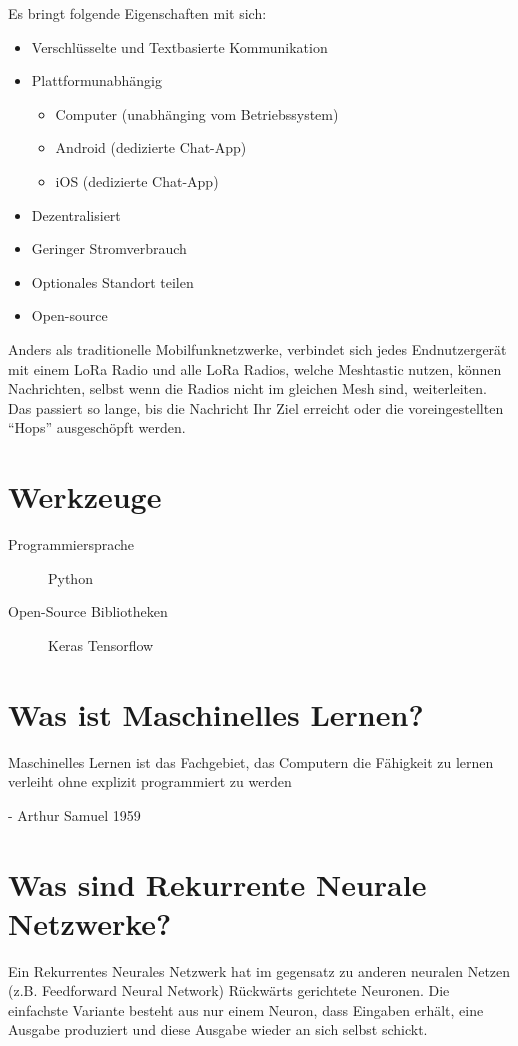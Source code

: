 \documentclass[12pt,a4paper]{article}
\begin{document}
Es bringt folgende Eigenschaften mit sich:
\begin{itemize}
	\item Verschlüsselte und Textbasierte Kommunikation
	\item Plattformunabhängig
	\begin{itemize}
		\item Computer (unabhänging vom Betriebssystem)
		\item Android (dedizierte Chat-App)
		\item iOS (dedizierte Chat-App)
	\end{itemize}
	\item Dezentralisiert
	\item Geringer Stromverbrauch
	\item Optionales Standort teilen
	\item Open-source
\end{itemize}

Anders als traditionelle Mobilfunknetzwerke, verbindet sich jedes Endnutzergerät mit einem LoRa Radio und alle LoRa Radios, welche Meshtastic nutzen, können Nachrichten, selbst wenn die Radios nicht im gleichen Mesh sind, weiterleiten. Das passiert so lange, bis die Nachricht Ihr Ziel erreicht oder die voreingestellten “Hops” ausgeschöpft werden.


\section{Werkzeuge}
\begin{description}


    \item [Programmiersprache]\tab Python
    \item [Open-Source Bibliotheken]\tab Keras \newline \tab \tab Tensorflow
 
 
\end{description}

\section{Was ist Maschinelles Lernen?}
Maschinelles Lernen ist das Fachgebiet, das Computern die Fähigkeit zu lernen verleiht ohne explizit programmiert zu werden
\begin{flushright} - Arthur Samuel 1959  \end{flushright}

\section{Was sind Rekurrente Neurale Netzwerke?}
Ein Rekurrentes Neurales Netzwerk hat im gegensatz zu anderen neuralen Netzen (z.B. Feedforward Neural Network) Rückwärts gerichtete Neuronen. 
Die einfachste Variante besteht aus nur einem Neuron, dass Eingaben erhält, eine Ausgabe produziert und diese Ausgabe wieder an sich selbst schickt.\newline
\end{document}
